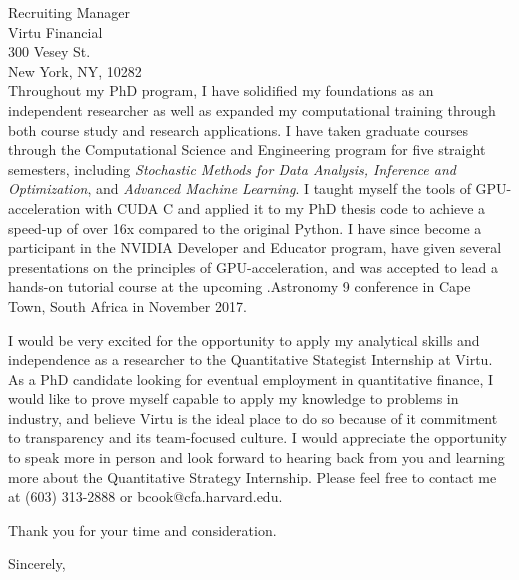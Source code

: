 \documentclass{letter}
\begin{document}
\begin{letter}{Recruiting Manager\\
Virtu Financial\\
300 Vesey St.\\
New York, NY, 10282\\
}
\noindent Throughout my PhD program, I have solidified my foundations
as an independent researcher as well as expanded my computational
training through both course study and research applications. I have
taken graduate courses through the Computational Science and
Engineering program for five straight semesters, including
\textit{Stochastic Methods for Data Analysis, Inference and
  Optimization}, and \textit{Advanced Machine Learning}. I taught
myself the tools of GPU-acceleration with CUDA C and applied it to my
PhD thesis code to achieve a speed-up of over 16x compared to the
original Python. I have since become a participant in the NVIDIA
Developer and Educator program, have given several presentations on
the principles of GPU-acceleration, and was accepted to lead a
hands-on tutorial course at the upcoming .Astronomy 9 conference in
Cape Town, South Africa in November 2017.

\noindent I would be very excited for the opportunity to apply my
analytical skills and independence as a researcher to the Quantitative
Stategist Internship at Virtu. As a PhD candidate looking for eventual
employment in quantitative finance, I would like to prove myself
capable to apply my knowledge to problems in industry, and believe
Virtu is the ideal place to do so because of it commitment to
transparency and its team-focused culture. I would appreciate the opportunity to
speak more in person and look forward to hearing back from you and
learning more about the Quantitative Strategy Internship. Please feel
free to contact me at (603) 313-2888 or bcook@cfa.harvard.edu.

Thank you for your time and consideration.


\closing{Sincerely,}


\end{letter}
\end{document}

